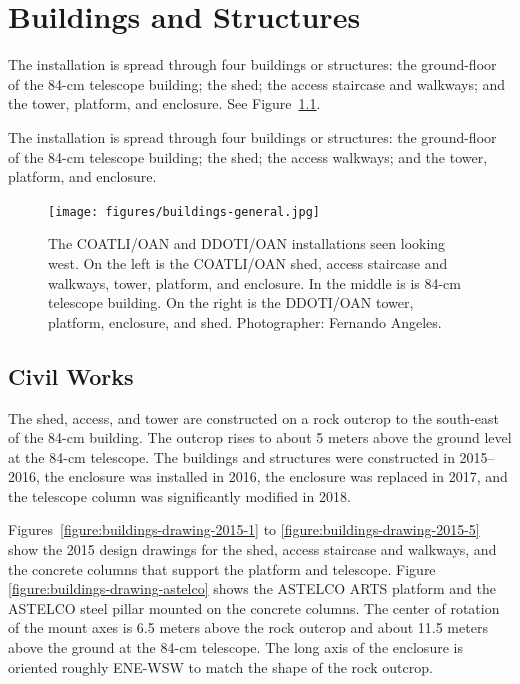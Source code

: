 \chapter{Buildings and Structures}
\label{chapter:buildings}

\ifcoatlioan

The {\projectname} installation is spread through four buildings or structures: the ground-floor of the 84-cm telescope building; the shed; the access staircase and walkways; and the tower, platform, and enclosure. See Figure~\ref{figure:buildings-general}.

\fi

\ifddotioan

The {\projectname} installation is spread through four buildings or structures: the ground-floor of the 84-cm telescope building; the shed; the access walkways; and the tower, platform, and enclosure.

\fi

\begin{figure}
\begin{center}
\texttt{[image: figures/buildings-general.jpg]}
\end{center}
\caption{The COATLI/OAN and DDOTI/OAN installations seen looking west. On the left is the COATLI/OAN shed, access staircase and walkways, tower, platform, and enclosure. In the middle is is 84-cm telescope building. On the right is the DDOTI/OAN tower, platform, enclosure, and shed. Photographer: Fernando Angeles.}
\label{figure:buildings-general}
\end{figure}


\section{Civil Works}

\ifcoatlioan

The shed, access, and tower are constructed on a rock outcrop to the south-east of the 84-cm building. The outcrop rises to about 5 meters above the ground level at the 84-cm telescope. The buildings and structures were constructed in 2015--2016, the enclosure was installed in 2016, the enclosure was replaced in 2017, and the telescope column was significantly modified in 2018.

Figures~\ref{figure:buildings-drawing-2015-1} to \ref{figure:buildings-drawing-2015-5} show the 2015 design drawings for the shed, access staircase and walkways, and the concrete columns that support the platform and telescope. Figure  \ref{figure:buildings-drawing-astelco} shows the ASTELCO ARTS platform and the ASTELCO steel pillar mounted on the concrete columns. The center of rotation of the mount axes is 6.5 meters above the rock outcrop and about 11.5 meters above the ground at the 84-cm telescope. The long axis of the enclosure is oriented roughly ENE-WSW to match the shape of the rock outcrop.

